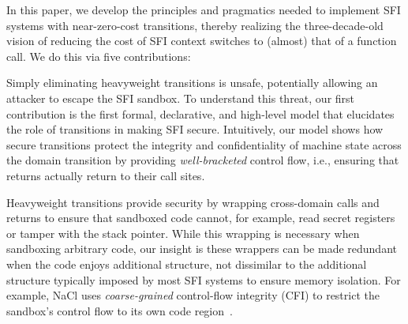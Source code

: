 In this paper, we develop the principles and pragmatics needed to implement
SFI systems with near-zero-cost transitions, thereby realizing the
three-decade-old vision of reducing the cost of SFI context switches to
(almost) that of a function call.
%
We do this via five contributions:

% 
Simply eliminating heavyweight transitions is unsafe, potentially allowing an
attacker to escape the SFI sandbox.
%
To understand this threat, our first contribution is the first formal,
declarative, and high-level model that elucidates the role of transitions in
making SFI secure.
%
Intuitively, our model shows how secure transitions 
protect the integrity and confidentiality of machine 
state across the domain transition by providing 
\emph{well-bracketed} control flow, i.e., ensuring 
that returns actually return to their call sites.
 
%
Heavyweight transitions provide security by wrapping 
cross-domain calls and returns to ensure that sandboxed code cannot, 
for example, read secret registers or tamper with the 
stack pointer.
%
While this wrapping is necessary when sandboxing arbitrary code, our insight is
these wrappers can be made redundant when the code enjoys additional structure,
not dissimilar to the additional structure typically imposed by most
SFI systems to ensure memory isolation.
%
For example, NaCl uses \emph{coarse-grained} control-flow integrity
(CFI) to restrict the sandbox's control flow to its own code
region~\cite{gang-sfi, yee_native_2009, haas_bringing_2017}.

